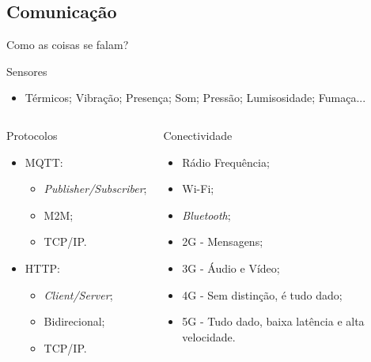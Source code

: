 \subsection*{Comunicação}
\begin{frame}{Como as coisas se falam?}
	\begin{block}{Sensores}
		\begin{itemize}
			\item Térmicos; Vibração; Presença; Som; Pressão; Lumisosidade; Fumaça...
		\end{itemize}
	\end{block}
	
	\begin{columns}
		\begin{block}{Protocolos}
			\begin{itemize}
				\item MQTT\footnotemark:
					\begin{itemize}
						\item \textit{Publisher/Subscriber};
						\item M2M;
						\item TCP/IP.
					\end{itemize} 
				\item HTTP: 
					\begin{itemize}
						\item \textit{Client/Server};
						\item Bidirecional;
						\item TCP/IP.
					\end{itemize}
			\end{itemize}
		\end{block}
		
		\begin{block}{Conectividade}
			\begin{itemize}
				\item Rádio Frequência;
				\item Wi-Fi;
				\item \textit{Bluetooth};
				\item 2G - Mensagens;
				\item 3G - Áudio e Vídeo;
				\item 4G - Sem distinção, é tudo dado;
				\item 5G - Tudo dado, baixa latência e alta velocidade.
			\end{itemize}
		\end{block}
	\end{columns}
\end{frame}

